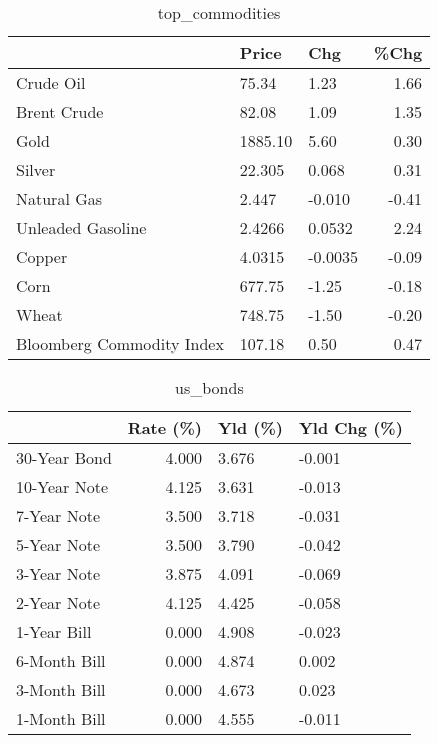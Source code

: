 \documentclass{article}%
\begin{document}
\begin{table}[htbp]%
\caption{top\_commodities}%
\centering%
\begin{adjustbox}{width=1\textwidth}%
\begin{tabular}{lllr}
\toprule
                          &   Price &     Chg &  \%Chg \\
\midrule
               Crude Oil  &   75.34 &    1.23 &  1.66 \\
             Brent Crude  &   82.08 &    1.09 &  1.35 \\
                    Gold  & 1885.10 &    5.60 &  0.30 \\
                  Silver  &  22.305 &   0.068 &  0.31 \\
             Natural Gas  &   2.447 &  -0.010 & -0.41 \\
       Unleaded Gasoline  &  2.4266 &  0.0532 &  2.24 \\
                  Copper  &  4.0315 & -0.0035 & -0.09 \\
                    Corn  &  677.75 &   -1.25 & -0.18 \\
                   Wheat  &  748.75 &   -1.50 & -0.20 \\
Bloomberg Commodity Index &  107.18 &    0.50 &  0.47 \\
\bottomrule
\end{tabular}
%
\end{adjustbox}%
\end{table}

%


\begin{table}[htbp]%
\caption{us\_bonds}%
\centering%
\begin{adjustbox}{width=1\textwidth}%
\begin{tabular}{lrll}
\toprule
             &  Rate (\%) & Yld (\%) & Yld Chg (\%) \\
\midrule
30-Year Bond &     4.000 &   3.676 &      -0.001 \\
10-Year Note &     4.125 &   3.631 &      -0.013 \\
 7-Year Note &     3.500 &   3.718 &      -0.031 \\
 5-Year Note &     3.500 &   3.790 &      -0.042 \\
 3-Year Note &     3.875 &   4.091 &      -0.069 \\
 2-Year Note &     4.125 &   4.425 &      -0.058 \\
 1-Year Bill &     0.000 &   4.908 &      -0.023 \\
6-Month Bill &     0.000 &   4.874 &       0.002 \\
3-Month Bill &     0.000 &   4.673 &       0.023 \\
1-Month Bill &     0.000 &   4.555 &      -0.011 \\
\bottomrule
\end{tabular}
%
\end{adjustbox}%
\end{table}
\end{document}
